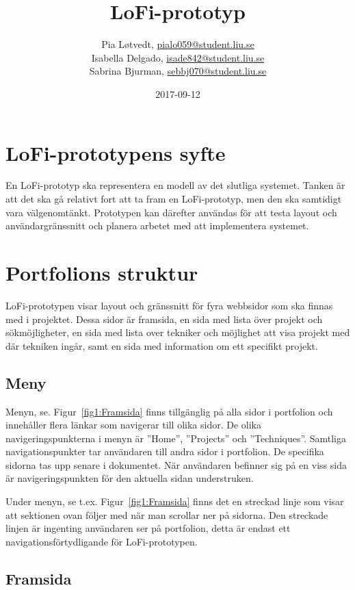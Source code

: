\documentclass{TDP003mall}
\author{Pia Løtvedt, \url{pialo059@student.liu.se}\\
  Isabella Delgado, \url{isade842@student.liu.se}\\
  Sabrina Bjurman, \url{sebbj070@student.liu.se}}
\title{LoFi-prototyp}
\date{2017-09-12}
\begin{document}
\projectpage

\tableofcontents

\pagebreak
\section{LoFi-prototypens syfte}

En LoFi-prototyp ska representera en modell av det slutliga systemet. Tanken är att det ska gå relativt fort att ta fram en LoFi-prototyp, men den ska samtidigt vara välgenomtänkt. Prototypen kan därefter användas för att testa layout och användargränssnitt och planera arbetet med att implementera systemet.


\pagebreak
\section{Portfolions struktur}

LoFi-prototypen visar layout och gränssnitt för fyra webbsidor som ska finnas med i projektet. Dessa sidor är framsida, en sida med lista över projekt och sökmöjligheter, en sida med lista
over tekniker och möjlighet att visa projekt med där tekniken ingår, samt en sida med information om ett specifikt projekt.

\subsection{Meny}

Menyn, se. Figur~\ref{fig1:Framsida} finns tillgänglig på alla sidor i portfolion och innehåller flera länkar som navigerar till olika sidor. De olika navigeringspunkterna i menyn är ''Home'', ''Projects'' och ''Techniques''. Samtliga navigationspunkter tar användaren till andra sidor i portfolion. De specifika sidorna tas upp senare i dokumentet. När användaren befinner sig på en viss sida är navigeringspunkten för den aktuella sidan understruken.

Under menyn, se t.ex. Figur~\ref{fig1:Framsida} finns det en streckad linje som visar att sektionen ovan följer med när man scrollar ner på sidorna. Den streckade linjen är ingenting användaren ser på portfolion, detta är endast ett navigationsförtydligande för LoFi-prototypen.


\pagebreak
\subsection{Framsida}
\end{document}
